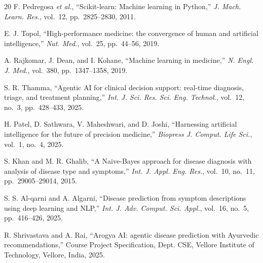 \documentclass[conference]{IEEEtran}
\begin{document}
\begin{thebibliography}{20}
F. Pedregosa \textit{et al.}, ``Scikit-learn: Machine learning in Python,''
\textit{J. Mach. Learn. Res.}, vol.~12, pp.~2825--2830, 2011.

E. J. Topol, ``High-performance medicine: the convergence of human and
artificial intelligence,'' \textit{Nat. Med.}, vol.~25, pp.~44--56, 2019.

A. Rajkomar, J. Dean, and I. Kohane, ``Machine learning in medicine,''
\textit{N. Engl. J. Med.}, vol.~380, pp.~1347--1358, 2019.

S. R. Thamma, ``Agentic AI for clinical decision support: real-time
diagnosis, triage, and treatment planning,'' \textit{Int. J. Sci. Res. Sci.
Eng. Technol.}, vol.~12, no.~3, pp.~428--433, 2025.

H. Patel, D. Sathwara, V. Maheshwari, and D. Joshi, ``Harnessing artificial
intelligence for the future of precision medicine,'' \textit{Biopress J.
Comput. Life Sci.}, vol.~1, no.~4, 2025.

S. Khan and M. R. Ghalib, ``A Naive-Bayes approach for disease diagnosis with
analysis of disease type and symptoms,'' \textit{Int. J. Appl. Eng. Res.},
vol.~10, no.~11, pp.~29005--29014, 2015.

S. S. Al-qarni and A. Algarni, ``Disease prediction from symptom descriptions
using deep learning and NLP,'' \textit{Int. J. Adv. Comput. Sci. Appl.},
vol.~16, no.~5, pp.~416--426, 2025.

R. Shrivastava and A. Rai, ``Arogya AI: agentic disease prediction with
Ayurvedic recommendations,'' Course Project Specification, Dept. CSE, Vellore
Institute of Technology, Vellore, India, 2025.

\end{thebibliography}
\end{document}
